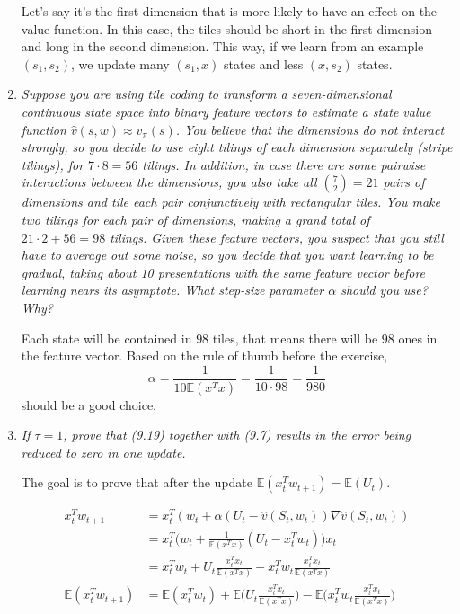 \documentclass[12pt,a4paper]{article}
\begin{document}
\begin{enumerate}
  Let's say it's the first dimension that is more likely to have an effect on the value
  function. In this case, the tiles should be short in the first dimension and long in
  the second dimension. This way, if we learn from an example $(s_1, s_2)$, we update
  many $(s_1, x)$ states and less $(x, s_2)$ states.

  \item \textit{Suppose you are using tile coding to transform a seven-dimensional continuous
  state space into binary feature vectors to estimate a state value function
  $\hat{v}(s,w) \approx v_\pi(s)$. You believe that the dimensions do not interact strongly,
  so you decide to use eight tilings of each dimension separately (stripe tilings), for 
  $7 \cdot 8 = 56$ tilings. In addition, in case there are some pairwise interactions between
  the dimensions, you also take all $\binom{7}{2} = 21$ pairs of dimensions and tile each
  pair conjunctively with rectangular tiles. You make two tilings for each pair of dimensions,
  making a grand total of $21 \cdot 2 + 56 = 98$ tilings. Given these feature vectors, you suspect
  that you still have to average out some noise, so you decide that you want learning to be
  gradual, taking about 10 presentations with the same feature vector before learning nears
  its asymptote. What step-size parameter $\alpha$ should you use? Why?}

  Each state will be contained in $98$ tiles, that means there will be $98$ ones in the feature vector.
  Based on the rule of thumb before the exercise,
  \[\alpha = \frac{1}{10 \mathbb{E}(x^Tx)} = \frac{1}{10 \cdot 98} = \frac{1}{980}\]
  should be a good choice.

  \item \textit{If $\tau = 1$, prove that (9.19) together with (9.7) results in the error being
  reduced to zero in one update.}

  The goal is to prove that after the update $\mathbb{E}(x_t^Tw_{t + 1}) = \mathbb{E}(U_t)$.

  \begin{align*}
    x_t^T w_{t + 1} &= x_t^T(w_t + \alpha(U_t - \hat{v}(S_t, w_t)) \nabla \hat{v}(S_t, w_t))\\
    &= x_t^T\Big(w_t + \frac{1}{\mathbb{E}(x^Tx)} (U_t - x_t^T w_t)\Big)x_t\\
    &= x_t^T w_t + U_t\frac{x_t^T x_t}{\mathbb{E}(x^Tx)} - x_t^T w_t \frac{x_t^T x_t}{\mathbb{E}(x^Tx)}\\
    \mathbb{E}(x_t^T w_{t + 1}) &= \mathbb{E}(x_t^T w_t)
    + \mathbb{E}\Big(U_t\frac{x_t^T x_t}{\mathbb{E}(x^Tx)}\Big)
    - \mathbb{E}\Big(x_t^T w_t \frac{x_t^T x_t}{\mathbb{E}(x^Tx)}\Big)
  \end{align*}


\end{enumerate}
\end{document}

